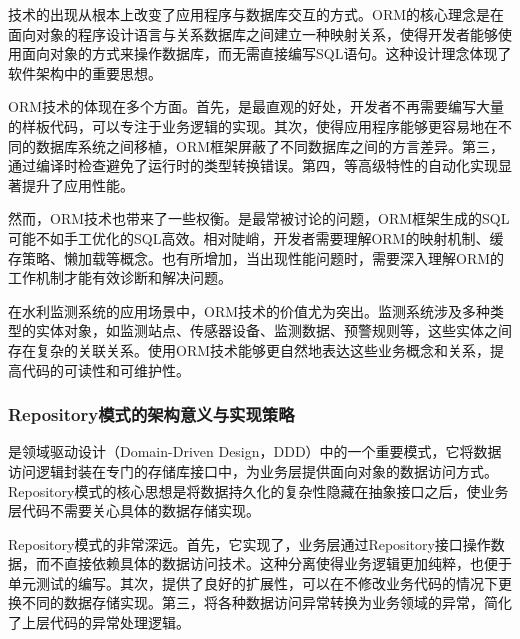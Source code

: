 技术的出现从根本上改变了应用程序与数据库交互的方式。ORM的核心理念是在面向对象的程序设计语言与关系数据库之间建立一种映射关系，使得开发者能够使用面向对象的方式来操作数据库，而无需直接编写SQL语句。这种设计理念体现了软件架构中的重要思想。

ORM技术的体现在多个方面。首先，是最直观的好处，开发者不再需要编写大量的样板代码，可以专注于业务逻辑的实现。其次，使得应用程序能够更容易地在不同的数据库系统之间移植，ORM框架屏蔽了不同数据库之间的方言差异。第三，通过编译时检查避免了运行时的类型转换错误。第四，等高级特性的自动化实现显著提升了应用性能。

然而，ORM技术也带来了一些权衡。是最常被讨论的问题，ORM框架生成的SQL可能不如手工优化的SQL高效。相对陡峭，开发者需要理解ORM的映射机制、缓存策略、懒加载等概念。也有所增加，当出现性能问题时，需要深入理解ORM的工作机制才能有效诊断和解决问题。

在水利监测系统的应用场景中，ORM技术的价值尤为突出。监测系统涉及多种类型的实体对象，如监测站点、传感器设备、监测数据、预警规则等，这些实体之间存在复杂的关联关系。使用ORM技术能够更自然地表达这些业务概念和关系，提高代码的可读性和可维护性。

\hypertarget{repositoryux6a21ux5f0fux7684ux67b6ux6784ux610fux4e49ux4e0eux5b9eux73b0ux7b56ux7565}{%
\subsubsection{Repository模式的架构意义与实现策略}\label{repositoryux6a21ux5f0fux7684ux67b6ux6784ux610fux4e49ux4e0eux5b9eux73b0ux7b56ux7565}}

是领域驱动设计（Domain-Driven Design，DDD）中的一个重要模式，它将数据访问逻辑封装在专门的存储库接口中，为业务层提供面向对象的数据访问方式。Repository模式的核心思想是将数据持久化的复杂性隐藏在抽象接口之后，使业务层代码不需要关心具体的数据存储实现。

Repository模式的非常深远。首先，它实现了，业务层通过Repository接口操作数据，而不直接依赖具体的数据访问技术。这种分离使得业务逻辑更加纯粹，也便于单元测试的编写。其次，提供了良好的扩展性，可以在不修改业务代码的情况下更换不同的数据存储实现。第三，将各种数据访问异常转换为业务领域的异常，简化了上层代码的异常处理逻辑。

